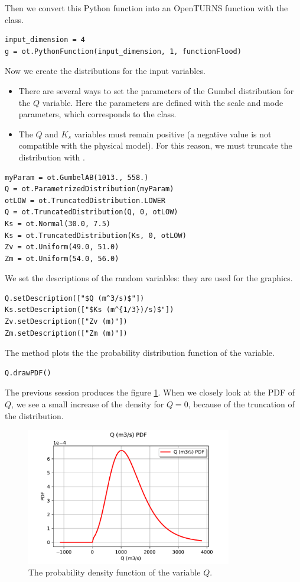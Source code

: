 \documentclass{uncecomp2019}
\begin{document}
Then we convert this Python function into an OpenTURNS function with the 
 class. 

\lstset{language=Python}
\begin{lstlisting}
input_dimension = 4
g = ot.PythonFunction(input_dimension, 1, functionFlood)
\end{lstlisting}

Now we create the distributions for the input variables.
\begin{itemize}
\item There are several ways to set the parameters of the Gumbel distribution for the $Q$ variable. 
Here the parameters are defined with the scale and mode parameters, which corresponds to the 
 class.
\item The $Q$ and $K_s$ variables must remain positive (a negative value is not compatible with the 
physical model). 
For this reason, we must truncate the distribution with 
.
\end{itemize}

\begin{lstlisting}
myParam = ot.GumbelAB(1013., 558.)
Q = ot.ParametrizedDistribution(myParam)
otLOW = ot.TruncatedDistribution.LOWER
Q = ot.TruncatedDistribution(Q, 0, otLOW)
Ks = ot.Normal(30.0, 7.5)
Ks = ot.TruncatedDistribution(Ks, 0, otLOW)
Zv = ot.Uniform(49.0, 51.0)
Zm = ot.Uniform(54.0, 56.0)
\end{lstlisting}

We set the descriptions of the random variables: they are used for the graphics.
\begin{lstlisting}
Q.setDescription(["$Q (m^3/s)$"])
Ks.setDescription(["$Ks (m^{1/3})/s)$"])
Zv.setDescription(["Zv (m)"])
Zm.setDescription(["Zm (m)"])
\end{lstlisting}

The  method plots the the probability distribution function of the variable. 
\begin{lstlisting}
Q.drawPDF()
\end{lstlisting}
The previous session produces the figure \ref{fig-variableQ}.
When we closely look at the PDF of $Q$, we see a small increase of the density for $Q=0$, because of the 
truncation of the distribution.


\begin{figure}
\centering
\includegraphics[width=0.8\textwidth]{figures/inputVariableQ.pdf}
\caption{The probability density function of the variable $Q$.}
\label{fig-variableQ}
\end{figure}
\end{document}
